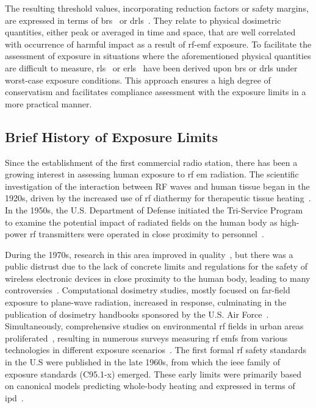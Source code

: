 The resulting threshold values, incorporating reduction factors or safety margins, are expressed in terms of \gls{br}s~\cite{ICNIRP2020Guidelines} or \gls{drl}s~\cite{IEEE2019Standard}.
They relate to physical dosimetric quantities, either peak or averaged in time and space, that are well correlated with occurrence of harmful impact as a result of \gls{rf}-\gls{emf} exposure.
To facilitate the assessment of exposure in situations where the aforementioned physical quantities are difficult to measure, \gls{rl}s~\cite{ICNIRP2020Guidelines} or \gls{erl}s~\cite{IEEE2019Standard} have been derived upon \gls{br}s or \gls{drl}s under worst-case exposure conditions.
This approach ensures a high degree of conservatism and facilitates compliance assessment with the exposure limits in a more practical manner.

\subsection{Brief History of Exposure Limits}
Since the establishment of the first commercial radio station, there has been a growing interest in assessing human exposure to \gls{rf} \gls{em} radiation.
The scientific investigation of the interaction between RF waves and human tissue began in the 1920s, driven by the increased use of \gls{rf} diathermy for therapeutic tissue heating~\cite{Kovacs1945Electrotherapy}.
In the 1950s, the U.S. Department of Defense initiated the Tri-Service Program to examine the potential impact of radiated fields on the human body as high-power \gls{rf} transmitters were operated in close proximity to personnel~\cite{Lin1994Early}.

During the 1970s, research in this area improved in quality~\cite{Guy1971Analyses}, but there was a public distrust due to the lack of concrete limits and regulations for the safety of wireless electronic devices in close proximity to the human body, leading to many controversies~\cite{Foster2022Three}.
Computational dosimetry studies, mostly focused on far-field exposure to plane-wave radiation, increased in response, culminating in the publication of dosimetry handbooks sponsored by the U.S. Air Force~\cite{Durney1986Radiofrequency}.
Simultaneously, comprehensive studies on environmental \gls{rf} fields in urban areas proliferated~\cite{Tell1976Measurement}, resulting in numerous surveys measuring \gls{rf} \gls{emf}s from various technologies in different exposure scenarios~\cite{Jalilian2019Public}.
The first formal \gls{rf} safety standards in the U.S were published in the late 1960s, from which the \gls{ieee} family of exposure standards (C95.1-x) emerged.
These early limits were primarily based on canonical models predicting whole-body heating and expressed in terms of \gls{ipd}~\cite{Roach2009Radiofrequency}.

